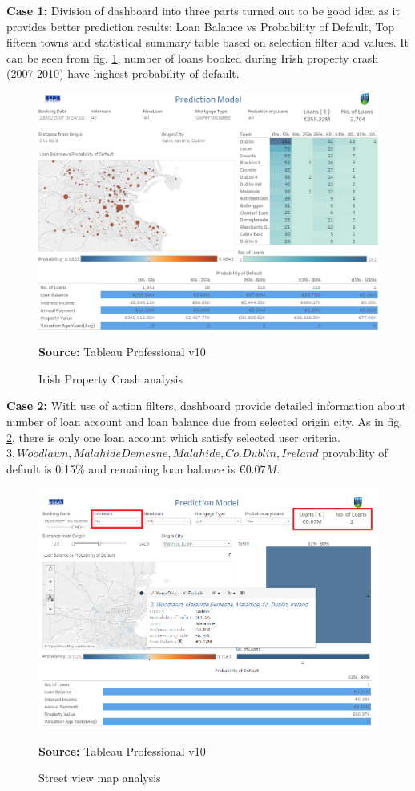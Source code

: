 \textbf{Case 1:} Division of dashboard into three parts turned out to be good idea as it provides better prediction results: Loan Balance vs Probability of Default, Top fifteen towns and statistical summary table based on selection filter and values. It can be seen from fig. \ref{fig:crash}, number of loans booked during Irish property crash (2007-2010) have highest probability of default.

\begin{center}
\begin{figure}[!htb]
\includegraphics[width=\textwidth]{crash.png}
\centering
\caption{Irish Property Crash analysis}{\textbf{Source:} Tableau Professional v10}
\label{fig:crash}
\end{figure}
\end{center}

\textbf{Case 2:} With use of action filters, dashboard provide detailed information about number of loan account and loan balance due from selected origin city. As in fig. \ref{fig:mala}, there is only one loan account which satisfy selected user criteria. $ 3, Woodlawn, Malahide Demesne, Malahide, Co. Dublin, Ireland$ provability of default is 0.15\% and remaining loan balance is $€0.07M$.  

\begin{center}
\begin{figure}[!htb]
\includegraphics[width=\textwidth]{mala.png}
\centering
\caption{Street view map analysis}{\textbf{Source:} Tableau Professional v10}
\label{fig:mala}
\end{figure}
\end{center}








